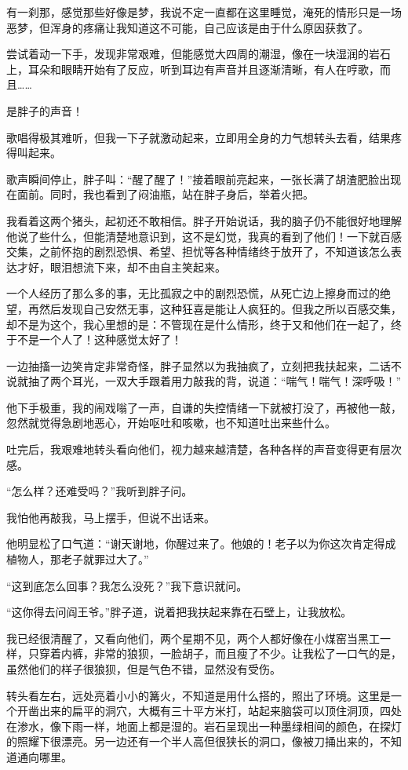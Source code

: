 有一刹那，感觉那些好像是梦，我说不定一直都在这里睡觉，淹死的情形只是一场恶梦，但浑身的疼痛让我知道这不可能，自己应该是由于什么原因获救了。

尝试着动一下手，发现非常艰难，但能感觉大四周的潮湿，像在一块湿润的岩石上，耳朵和眼睛开始有了反应，听到耳边有声音并且逐渐清晰，有人在哼歌，而且……

是胖子的声音！

歌唱得极其难听，但我一下子就激动起来，立即用全身的力气想转头去看，结果疼得叫起来。

歌声瞬间停止，胖子叫：“醒了醒了！”接着眼前亮起来，一张长满了胡渣肥脸出现在面前。同时，我也看到了闷油瓶，站在胖子身后，举着火把。

我看着这两个猪头，起初还不敢相信。胖子开始说话，我的脑子仍不能很好地理解他说了些什么，但能清楚地意识到，这不是幻觉，我真的看到了他们！一下就百感交集，之前怀抱的剧烈恐惧、希望、担忧等各种情绪终于放开了，不知道该怎么表达才好，眼泪想流下来，却不由自主笑起来。

一个人经历了那么多的事，无比孤寂之中的剧烈恐慌，从死亡边上擦身而过的绝望，再然后发现自己安然无事，这种狂喜是能让人疯狂的。但我之所以百感交集，却不是为这个，我心里想的是：不管现在是什么情形，终于又和他们在一起了，终于不是一个人了！这种感觉太好了！

一边抽搐一边笑肯定非常奇怪，胖子显然以为我抽疯了，立刻把我扶起来，二话不说就抽了两个耳光，一双大手跟着用力敲我的背，说道：“喘气！喘气！深呼吸！”

他下手极重，我的闹戏嗡了一声，自谦的失控情绪一下就被打没了，再被他一敲，忽然就觉得急剧地恶心，开始呕吐和咳嗽，也不知道吐出来些什么。

吐完后，我艰难地转头看向他们，视力越来越清楚，各种各样的声音变得更有层次感。

“怎么样？还难受吗？”我听到胖子问。

我怕他再敲我，马上摆手，但说不出话来。

他明显松了口气道：“谢天谢地，你醒过来了。他娘的！老子以为你这次肯定得成植物人，那老子就罪过大了。”

“这到底怎么回事？我怎么没死？”我下意识就问。

“这你得去问阎王爷。”胖子道，说着把我扶起来靠在石壁上，让我放松。

我已经很清醒了，又看向他们，两个星期不见，两个人都好像在小煤窑当黑工一样，只穿着内裤，非常的狼狈，一脸胡子，而且瘦了不少。让我松了一口气的是，虽然他们的样子很狼狈，但是气色不错，显然没有受伤。

转头看左右，远处亮着小小的篝火，不知道是用什么搭的，照出了环境。这里是一个开凿出来的扁平的洞穴，大概有三十平方米打，站起来脑袋可以顶住洞顶，四处在渗水，像下雨一样，地面上都是湿的。岩石呈现出一种墨绿相间的颜色，在探灯的照耀下很漂亮。另一边还有一个半人高但很狭长的洞口，像被刀捅出来的，不知道通向哪里。

